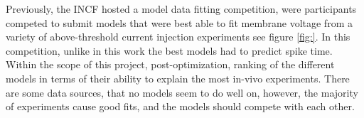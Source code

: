 Previously, the INCF hosted a model data fitting competition, were participants competed to submit models that were best able to fit membrane voltage from a variety of above-threshold current injection experiments see figure \ref{fig:}. In this competition, unlike in this work the best models had to predict spike time. Within the scope of this project, post-optimization, ranking of the different models in terms of their ability to explain the most in-vivo experiments.  There are some data sources, that no models seem to do well on, however, the majority of experiments cause good fits, and the models should compete with each other.